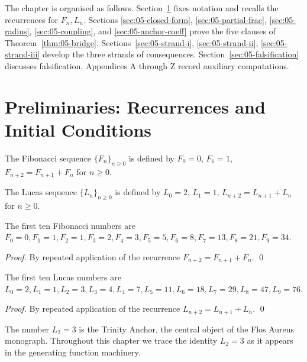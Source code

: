 The chapter is organised as follows. Section~\ref{sec:05-prelim}
fixes notation and recalls the recurrences for $F_n, L_n$. Sections
\ref{sec:05-closed-form}, \ref{sec:05-partial-frac}, \ref{sec:05-radius},
\ref{sec:05-coupling}, and \ref{sec:05-anchor-coeff} prove the five
clauses of Theorem~\ref{thm:05-bridge}. Sections~\ref{sec:05-strand-i},
\ref{sec:05-strand-ii}, \ref{sec:05-strand-iii} develop the three
strands of consequences. Section~\ref{sec:05-falsification} discusses
falsification. Appendices A through Z record auxiliary computations.

\section{Preliminaries: Recurrences and Initial Conditions}
\label{sec:05-prelim}

\begin{definition}
\label{fa_05:def:05-fib}
The Fibonacci sequence $\{F_n\}_{n \ge 0}$ is defined by
$F_0 = 0$, $F_1 = 1$, $F_{n+2} = F_{n+1} + F_n$ for $n \ge 0$.
\end{definition}

\begin{definition}
\label{fa_05:def:05-luc}
The Lucas sequence $\{L_n\}_{n \ge 0}$ is defined by
$L_0 = 2$, $L_1 = 1$, $L_{n+2} = L_{n+1} + L_n$ for $n \ge 0$.
\end{definition}

\begin{lemma}
\label{fa_05:lem:05-fib-vals}
The first ten Fibonacci numbers are
$F_0 = 0, F_1 = 1, F_2 = 1, F_3 = 2, F_4 = 3, F_5 = 5, F_6 = 8,
F_7 = 13, F_8 = 21, F_9 = 34$.
\end{lemma}

\begin{proof}
By repeated application of the recurrence $F_{n+2} = F_{n+1} + F_n$. \qed
\end{proof}

\begin{lemma}
\label{fa_05:lem:05-luc-vals}
The first ten Lucas numbers are
$L_0 = 2, L_1 = 1, L_2 = 3, L_3 = 4, L_4 = 7, L_5 = 11, L_6 = 18,
L_7 = 29, L_8 = 47, L_9 = 76$.
\end{lemma}

\begin{proof}
By repeated application of the recurrence $L_{n+2} = L_{n+1} + L_n$. \qed
\end{proof}

\begin{remark}
The number $L_2 = 3$ is the Trinity Anchor, the central object of the
Flos Aureus monograph. Throughout this chapter we trace the identity
$L_2 = 3$ as it appears in the generating function machinery.
\end{remark}

